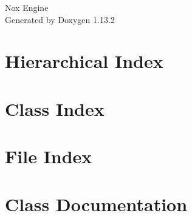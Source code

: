 \documentclass[twoside]{book}
\newcommand{\+}{\discretionary{\mbox{\scriptsize$\hookleftarrow$}}{}{}}
\newcommand{\clearemptydoublepage}{%
    \newpage{\pagestyle{empty}\cleardoublepage}%
  }
\begin{document}
  \raggedbottom
    \hypersetup{pageanchor=false,
                bookmarksnumbered=true,
                pdfencoding=unicode
               }
  \begin{titlepage}
  \vspace*{7cm}
  \begin{center}%
  {\Large Nox Engine}\\
  \vspace*{1cm}
  {\large Generated by Doxygen 1.13.2}\\
  \end{center}
  \end{titlepage}
  \clearemptydoublepage
  \tableofcontents
  \clearemptydoublepage
  \hypersetup{pageanchor=true}

\chapter{Hierarchical Index}

\chapter{Class Index}

\chapter{File Index}

\chapter{Class Documentation}





















\end{document}

